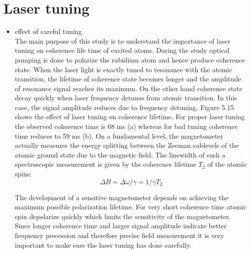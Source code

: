    \section{Laser tuning} 
   \begin{itemize}
   \item effect of careful tuning\\
	The main purpose of this study is to understand the importance of laser tuning on coherence life time of excited atoms. During the study optical pumping is done to polarize the rubidium atom and hence produce coherence state. When the laser light  is  exactly tuned to resonance with the atomic transition, the lifetime of coherence state becomes longer and the amplitude of resonance signal reaches its maximum. On the other hand coherence state decay  quickly when laser frequency detunes from atomic transition. In this case, the signal amplitude reduces due to frequency detuning. Figure 5.15 shows the effect of laser tuning on coherence lifetime. For proper laser tuning the observed coherence time is 68 ms (a) whereas for bad tuning coherence time reduces to 59 ms (b). On a fundamental level, the magnetometer actually measures the energy splitting between the Zeeman sublevels of the atomic ground state due to the magnetic field. The linewidth of such a spectroscopic measurement is given by the coherence lifetime $T_2$ of the atomic spins:
\begin{equation}
 ΔB = \Delta\omega/\gamma  = 1/γ T_2
\end{equation}

The development of a sensitive magnetometer depends on achieving the maximum possible polarization lifetime.  For very short coherence time atomic spin depolarize quickly which limits the sensitivity of the magnetometer.
Since  longer coherence time and larger signal amplitude indicate better frequency precession and therefore precise field measurement it is very important to make sure the laser tuning has done carefully.
   \begin{figure}
    \centering
 

\end{figure}
\end{itemize}
